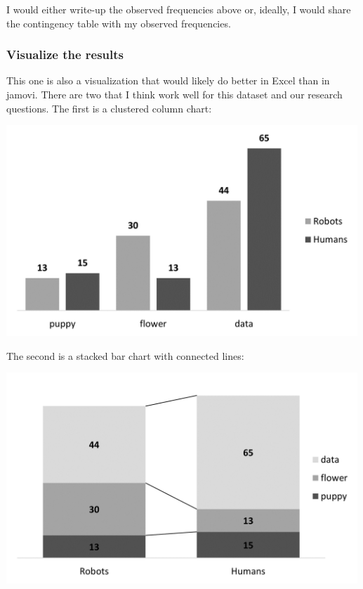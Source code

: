 \documentclass[
]{book}
\begin{document}
I would either write-up the observed frequencies above or, ideally, I would share the contingency table with my observed frequencies.

\hypertarget{visualize-the-results-4}{%
\subsubsection{Visualize the results}\label{visualize-the-results-4}}

This one is also a visualization that would likely do better in Excel than in jamovi. There are two that I think work well for this dataset and our research questions. The first is a clustered column chart:

\includegraphics[width=5.20833in,height=\textheight]{images/11-independence/independence_excel1.png}

The second is a stacked bar chart with connected lines:

\includegraphics[width=5.20833in,height=\textheight]{images/11-independence/independence_excel2.png}
\end{document}
